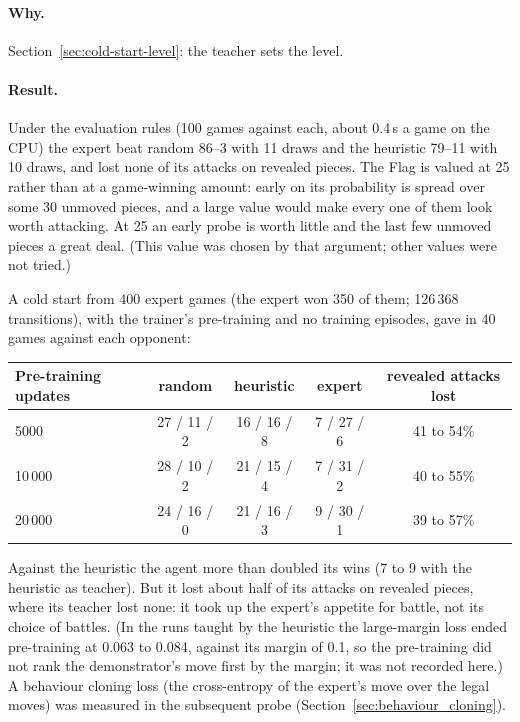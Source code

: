 \paragraph{Why.} Section~\ref{sec:cold-start-level}: the teacher sets the level.

\paragraph{Result.} Under the evaluation rules (100 games against each, about 0.4\,s a game on the
CPU) the expert beat random 86--3 with 11 draws and the heuristic 79--11 with 10 draws, and lost none
of its attacks on revealed pieces. The Flag is valued at 25 rather than at a game-winning amount:
early on its probability is spread over some 30 unmoved pieces, and a large value would make every
one of them look worth attacking. At 25 an early probe is worth little and the last few unmoved
pieces a great deal. (This value was chosen by that argument; other values were not tried.)

A cold start from 400 expert games (the expert won 350 of them; 126\,368 transitions), with the
trainer's pre-training and no training episodes, gave in 40 games against each opponent:
\begin{center}
\small
\begin{tabular}{lcccc}
\toprule
Pre-training updates & random & heuristic & expert & revealed attacks lost \\
\midrule
5000   & 27 / 11 / 2 & 16 / 16 / 8 & 7 / 27 / 6 & 41 to 54\% \\
10\,000 & 28 / 10 / 2 & 21 / 15 / 4 & 7 / 31 / 2 & 40 to 55\% \\
20\,000 & 24 / 16 / 0 & 21 / 16 / 3 & 9 / 30 / 1 & 39 to 57\% \\
\bottomrule
\end{tabular}
\end{center}
Against the heuristic the agent more than doubled its wins (7 to 9 with the heuristic as teacher).
But it lost about half of its attacks on revealed pieces, where its teacher lost none: it took up
the expert's appetite for battle, not its choice of battles. (In the runs taught by the heuristic
the large-margin loss ended pre-training at 0.063 to 0.084, against its margin of 0.1, so the
pre-training did not rank the demonstrator's move first by the margin; it was not recorded here.) A behaviour
cloning loss (the cross-entropy of the expert's move over the legal moves) was measured in the
subsequent probe (Section~\ref{sec:behaviour_cloning}).

